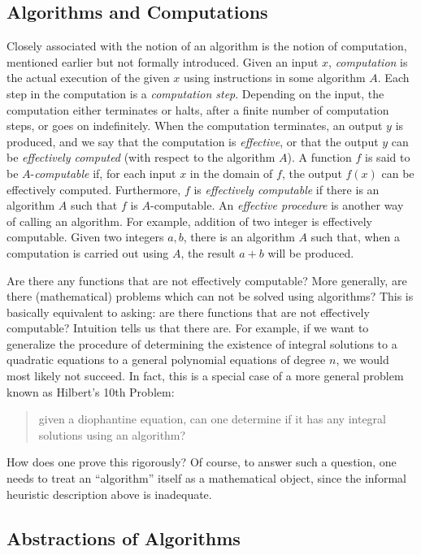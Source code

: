 \documentclass[12pt]{article}
\begin{document}
\subsection*{Algorithms and Computations}

Closely associated with the notion of an algorithm is the notion of computation, mentioned earlier but not formally introduced.  Given an input $x$, \emph{computation} is the actual execution of the given $x$ using instructions in some algorithm $A$.  Each step in the computation is a \emph{computation step}.  Depending on the input, the computation either terminates or halts, after a finite number of computation steps, or goes on indefinitely.  When the computation terminates, an output $y$ is produced, and we say that the computation is \emph{effective}, or that the output $y$ can be \emph{effectively computed} (with respect to the algorithm $A$).  A function $f$ is said to be $A$-\emph{computable} if, for each input $x$ in the domain of $f$, the output $f(x)$ can be effectively computed.  Furthermore, $f$ is \emph{effectively computable} if there is an algorithm $A$ such that $f$ is $A$-computable.  An \emph{effective procedure} is another way of calling an algorithm.  For example, addition of two integer is effectively computable.  Given two integers $a,b$, there is an algorithm $A$ such that, when a computation is carried out using $A$, the result $a+b$ will be produced.

Are there any functions that are not effectively computable?  More generally, are there (mathematical) problems which can not be solved using algorithms?  This is basically equivalent to asking: are there functions that are not effectively computable?  Intuition tells us that there are.  For example, if we want to generalize the procedure of determining the existence of integral solutions to a quadratic equations to a general polynomial equations of degree $n$, we would most likely not succeed.  In fact, this is a special case of a more general problem known as Hilbert's 10th Problem: 
\begin{quote} given a diophantine equation, can one determine if it has any integral solutions using an algorithm? \end{quote}
How does one prove this rigorously?  Of course, to answer such a question, one needs to treat an ``algorithm'' itself as a mathematical object, since the informal heuristic description above is inadequate.

\subsection*{Abstractions of Algorithms}
\end{document}
